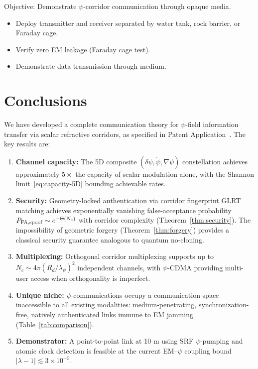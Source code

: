 \documentclass[twocolumn,superscriptaddress,prd,nofootinbib]{revtex4-2}
\begin{document}
Objective: Demonstrate $\psi$-corridor communication through opaque media.

\begin{itemize}
\item Deploy transmitter and receiver separated by water tank, rock
barrier, or Faraday cage.
\item Verify zero EM leakage (Faraday cage test).
\item Demonstrate data transmission through medium.
\end{itemize}

\section{Conclusions}\label{sec:conclusions}

We have developed a complete communication theory for $\psi$-field
information transfer via scalar refractive corridors, as specified in
Patent Application~\cite{Alcock2025Patent8}.
The key results are:

\begin{enumerate}
\item \textbf{Channel capacity:} The 5D composite
$(\delta\psi, \dot\psi, \nabla\psi)$ constellation achieves
approximately $5\times$ the capacity of scalar modulation alone,
with the Shannon limit~\eqref{eq:capacity-5D} bounding achievable
rates.

\item \textbf{Security:} Geometry-locked authentication via corridor
fingerprint GLRT matching achieves exponentially vanishing
false-acceptance probability
$P_{\rm FA,spoof} \sim e^{-\Theta(N_s)}$ with corridor complexity
(Theorem~\ref{thm:security}).
The impossibility of geometric forgery
(Theorem~\ref{thm:forgery}) provides a classical security guarantee
analogous to quantum no-cloning.

\item \textbf{Multiplexing:} Orthogonal corridor multiplexing supports
up to $N_c \sim 4\pi(R_d/\lambda_\psi)^2$ independent channels,
with $\psi$-CDMA providing multi-user access when orthogonality is
imperfect.

\item \textbf{Unique niche:} $\psi$-communications occupy a
communication space inaccessible to all existing modalities:
medium-penetrating, synchronization-free, natively authenticated
links immune to EM jamming (Table~\ref{tab:comparison}).

\item \textbf{Demonstrator:} A point-to-point link at 10 m using
SRF $\psi$-pumping and atomic clock detection is feasible at the
current EM--$\psi$ coupling bound
$|\lambda - 1| \lesssim 3 \times 10^{-5}$.
\end{enumerate}
\end{document}
